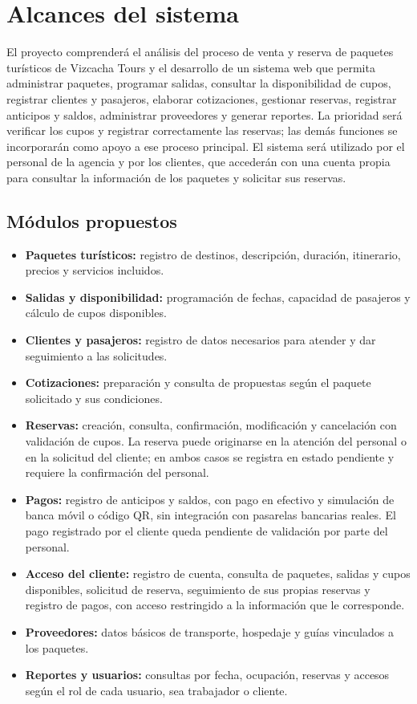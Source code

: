 \chapter{Alcances del sistema}
\label{cap:alcances}

El proyecto comprenderá el análisis del proceso de venta y reserva de
paquetes turísticos de Vizcacha Tours y el desarrollo de un sistema web que
permita administrar paquetes, programar salidas, consultar la disponibilidad
de cupos, registrar clientes y pasajeros, elaborar cotizaciones, gestionar
reservas, registrar anticipos y saldos, administrar proveedores y generar
reportes. La prioridad será verificar los cupos y registrar correctamente las
reservas; las demás funciones se incorporarán como apoyo a ese proceso
principal. El sistema será utilizado por el personal de la agencia y por los
clientes, que accederán con una cuenta propia para consultar la información
de los paquetes y solicitar sus reservas.

\section{Módulos propuestos}

\begin{itemize}
  \item \textbf{Paquetes turísticos:} registro de destinos, descripción,
        duración, itinerario, precios y servicios incluidos.
  \item \textbf{Salidas y disponibilidad:} programación de fechas, capacidad
        de pasajeros y cálculo de cupos disponibles.
  \item \textbf{Clientes y pasajeros:} registro de datos necesarios para
        atender y dar seguimiento a las solicitudes.
  \item \textbf{Cotizaciones:} preparación y consulta de propuestas según el
        paquete solicitado y sus condiciones.
  \item \textbf{Reservas:} creación, consulta, confirmación, modificación y
        cancelación con validación de cupos. La reserva puede originarse en la
        atención del personal o en la solicitud del cliente; en ambos casos se
        registra en estado pendiente y requiere la confirmación del personal.
  \item \textbf{Pagos:} registro de anticipos y saldos, con pago en efectivo y
        simulación de banca móvil o código QR, sin integración con pasarelas
        bancarias reales. El pago registrado por el cliente queda pendiente de
        validación por parte del personal.
  \item \textbf{Acceso del cliente:} registro de cuenta, consulta de paquetes,
        salidas y cupos disponibles, solicitud de reserva, seguimiento de sus
        propias reservas y registro de pagos, con acceso restringido a la
        información que le corresponde.
  \item \textbf{Proveedores:} datos básicos de transporte, hospedaje y guías
        vinculados a los paquetes.
  \item \textbf{Reportes y usuarios:} consultas por fecha, ocupación, reservas
        y accesos según el rol de cada usuario, sea trabajador o cliente.
\end{itemize}

